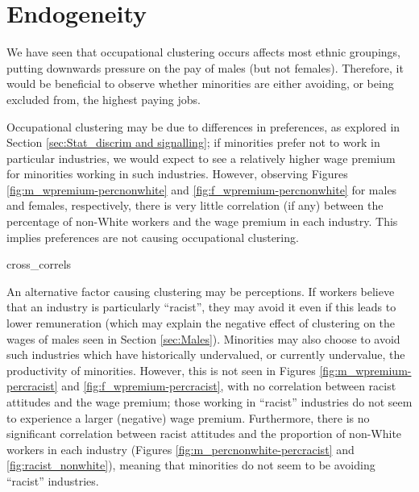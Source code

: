 \documentclass[class=article, crop=false]{standalone}
\begin{document}
\section{Endogeneity}
\label{sec:endogeneity}
We have seen that occupational clustering occurs affects most ethnic groupings, putting downwards pressure on the pay of males (but not females). Therefore, it would be beneficial to observe whether minorities are either avoiding, or being excluded from, the highest paying jobs.

Occupational clustering may be due to differences in preferences, as explored in Section \ref{sec:Stat_discrim and signalling}; if minorities prefer not to work in particular industries, we would expect to see a relatively higher wage premium for minorities working in such industries. However, observing Figures \ref{fig:m_wpremium-percnonwhite} and \ref{fig:f_wpremium-percnonwhite} for males and females, respectively, there is very little correlation (if any) between the percentage of non-White workers and the wage premium in each industry. This implies preferences are not causing occupational clustering.

{cross_correls}
%

An alternative factor causing clustering may be perceptions. If workers believe that an industry is particularly \enquote{racist}, they may avoid it even if this leads to lower remuneration (which may explain the negative effect of clustering on the wages of males seen in Section \ref{sec:Males}). Minorities may also choose to avoid such industries which have historically undervalued, or currently undervalue, the productivity of minorities. However, this is not seen in Figures \ref{fig:m_wpremium-percracist} and \ref{fig:f_wpremium-percracist}, with no correlation between racist attitudes and the wage premium; those working in \enquote{racist} industries do not seem to experience a larger (negative) wage premium. Furthermore, there is no significant correlation between racist attitudes and the proportion of non-White workers in each industry (Figures \ref{fig:m_percnonwhite-percracist} and \ref{fig:racist_nonwhite}), meaning that minorities do not seem to be avoiding \enquote{racist} industries.
\end{document}

